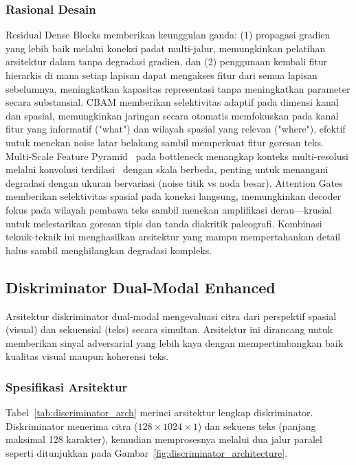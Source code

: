 \documentclass[journal]{IEEEtran}
\begin{document}
\subsubsection{Rasional Desain}

Residual Dense Blocks memberikan keunggulan ganda: (1) propagasi gradien yang lebih baik melalui koneksi padat multi-jalur, memungkinkan pelatihan arsitektur dalam tanpa degradasi gradien, dan (2) penggunaan kembali fitur hierarkis di mana setiap lapisan dapat mengakses fitur dari semua lapisan sebelumnya, meningkatkan kapasitas representasi tanpa meningkatkan parameter secara substansial. CBAM memberikan selektivitas adaptif pada dimensi kanal dan spasial, memungkinkan jaringan secara otomatis memfokuskan pada kanal fitur yang informatif ("what") dan wilayah spasial yang relevan ("where"), efektif untuk menekan noise latar belakang sambil memperkuat fitur goresan teks. Multi-Scale Feature Pyramid~\cite{lin2017fpn} pada bottleneck menangkap konteks multi-resolusi melalui konvolusi terdilasi~\cite{chen2017deeplab} dengan skala berbeda, penting untuk menangani degradasi dengan ukuran bervariasi (noise titik vs noda besar). Attention Gates~\cite{oktay2018attention} memberikan selektivitas spasial pada koneksi langsung, memungkinkan decoder fokus pada wilayah pembawa teks sambil menekan amplifikasi derau—krusial untuk melestarikan goresan tipis dan tanda diakritik paleografi. Kombinasi teknik-teknik ini menghasilkan arsitektur yang mampu mempertahankan detail halus sambil menghilangkan degradasi kompleks.

\subsection{Diskriminator Dual-Modal Enhanced}

Arsitektur diskriminator dual-modal mengevaluasi citra dari perspektif spasial (visual) dan sekuensial (teks) secara simultan. Arsitektur ini dirancang untuk memberikan sinyal adversarial yang lebih kaya dengan mempertimbangkan baik kualitas visual maupun koherensi teks.

\subsubsection{Spesifikasi Arsitektur}

Tabel~\ref{tab:discriminator_arch} merinci arsitektur lengkap diskriminator. Diskriminator menerima citra ($128 \times 1024 \times 1$) dan sekuens teks (panjang maksimal 128 karakter), kemudian memprosesnya melalui dua jalur paralel seperti ditunjukkan pada Gambar~\ref{fig:discriminator_architecture}.
\end{document}
